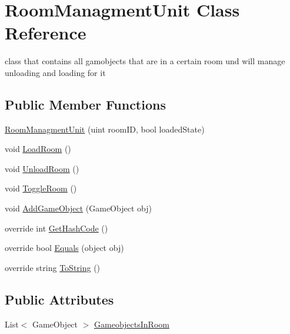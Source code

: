 \hypertarget{class_room_managment_unit}{}\section{Room\+Managment\+Unit Class Reference}
\label{class_room_managment_unit}


class that contains all gamobjects that are in a certain room und will manage unloading and loading for it  


\subsection*{Public Member Functions}
\begin{DoxyCompactItemize}
\item 
\mbox{\hyperlink{class_room_managment_unit_ad9c4cf6c496f32f6e0edbe47a4bf0295}{Room\+Managment\+Unit}} (uint room\+ID, bool loaded\+State)
\item 
void \mbox{\hyperlink{class_room_managment_unit_a7f34dfb62166ebcbd2a314f0bcdb61e9}{Load\+Room}} ()
\item 
void \mbox{\hyperlink{class_room_managment_unit_a45c039de8a79db7ada5831e0abeda972}{Unload\+Room}} ()
\item 
void \mbox{\hyperlink{class_room_managment_unit_a6043074719f8d67150cbfcff4c7a4cec}{Toggle\+Room}} ()
\item 
void \mbox{\hyperlink{class_room_managment_unit_ac7f3f62eb0e6f9f0bb239266796a323a}{Add\+Game\+Object}} (Game\+Object obj)
\item 
override int \mbox{\hyperlink{class_room_managment_unit_ad76ae60e41c36a71934ff9cccca60039}{Get\+Hash\+Code}} ()
\item 
override bool \mbox{\hyperlink{class_room_managment_unit_a663946fa33bad407b32d75aea8e7d5d9}{Equals}} (object obj)
\item 
override string \mbox{\hyperlink{class_room_managment_unit_af1299b6fbb2496cc4cb0e14a95cc2b9c}{To\+String}} ()
\end{DoxyCompactItemize}
\subsection*{Public Attributes}
\begin{DoxyCompactItemize}
\item 
List$<$ Game\+Object $>$ \mbox{\hyperlink{class_room_managment_unit_afb66a8eafa5ec0399e83b670ed2db21f}{Gameobjects\+In\+Room}}
\end{DoxyCompactItemize}
